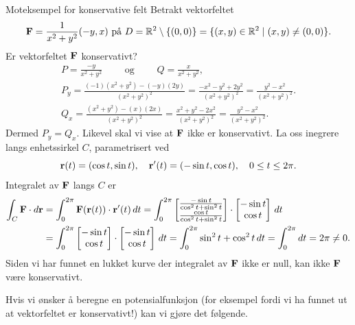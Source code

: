 \begin{eks}{Moteksempel for konservative felt} \label{eks:moteks_konserv}
Betrakt vektorfeltet 
\[
\mathbf{F} = \frac{1}{x^2 + y^2}(-y, x)
\text{ på } D = \mathbb{R}^2 \setminus \{(0, 0)\} = \{(x, y) \in \mathbb{R}^2 \mid (x, y) \ne (0, 0)\}.
\]
Er vektorfeltet $\mathbf{F}$ konservativt?
\begin{align*}
P = \frac{-y}{x^2 + y^2} \qquad \text{ og } \qquad Q = \frac{x}{x^2 + y^2},
\\
P_y = \frac{(-1)(x^2 + y^2) - (-y)(2y)}{(x^2 + y^2)^2} 
= \frac{-x^2 - y^2 + 2y^2}{(x^2 + y^2)^2} 
= \frac{y^2 - x^2}{(x^2 + y^2)^2}.\\
Q_x = \frac{(x^2 + y^2) - (x)(2x)}{(x^2 + y^2)^2} 
= \frac{x^2 + y^2 - 2x^2}{(x^2 + y^2)^2} 
= \frac{y^2 - x^2}{(x^2 + y^2)^2}.
\end{align*}
Dermed $P_y = Q_x$. Likevel skal vi vise at $\mathbf{F}$ ikke er konservativt. La oss inegrere langs enhetssirkel $C$, parametrisert ved
\[
\mathbf{r}(t) = (\cos t, \sin t), 
\quad \mathbf{r}'(t) = (-\sin t, \cos t), \quad 0 \leq t \leq 2\pi.
\]
Integralet av $\mathbf{F}$ langs $C$ er
\begin{align*}
\int_C \mathbf{F} \cdot d\mathbf{r} &= 
\int_0^{2\pi} \mathbf{F}(\mathbf{r}(t)) \cdot \mathbf{r}'(t)\, dt
= \int_0^{2\pi} 
\begin{bmatrix}
\frac{-\sin t}{\cos^2 t + \sin^2 t}\\
\frac{\cos t}{\cos^2 t + \sin^2 t}
\end{bmatrix}
\cdot \begin{bmatrix}-\sin t\\ \cos t\end{bmatrix}\, dt
\\
&= \int_0^{2\pi} \begin{bmatrix}-\sin t\\ \cos t\end{bmatrix} \cdot \begin{bmatrix}-\sin t\\ \cos t\end{bmatrix}\, dt 
= \int_0^{2\pi} \sin^2 t + \cos^2 t\, dt 
= \int_0^{2\pi} dt 
= 2\pi \ne 0.
\end{align*}
Siden vi har funnet en lukket kurve der integralet av $\mathbf{F}$ ikke er null, kan ikke $\mathbf{F}$ være konservativt.
\end{eks}

Hvis vi ønsker å beregne en potensialfunksjon (for eksempel fordi vi ha funnet ut at vektorfeltet er konservativt!) kan vi gjøre det følgende.

